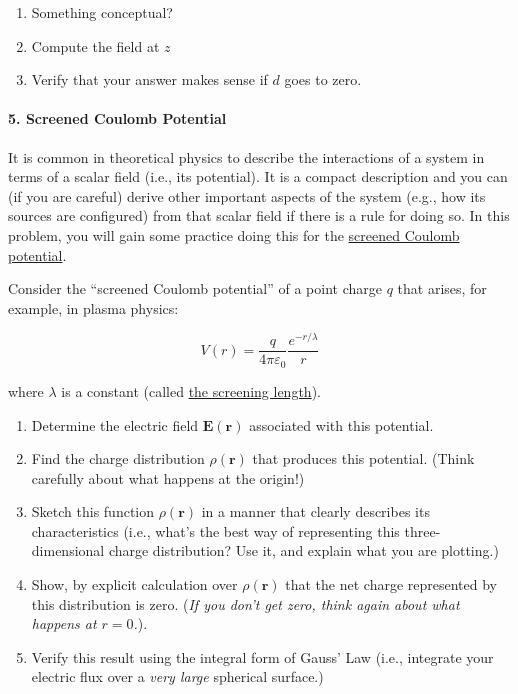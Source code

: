 \documentclass[11pt]{article}
\def\tightlist{}
\begin{document}
\begin{enumerate}
\def\labelenumi{\arabic{enumi}.}
\tightlist
\item
  Something conceptual?
\item
  Compute the field at \(z\)
\item
  Verify that your answer makes sense if \(d\) goes to zero.
\end{enumerate}

\paragraph{5. Screened Coulomb
Potential}\label{screened-coulomb-potential}

It is common in theoretical physics to describe the interactions of a
system in terms of a scalar field (i.e., its potential). It is a compact
description and you can (if you are careful) derive other important
aspects of the system (e.g., how its sources are configured) from that
scalar field if there is a rule for doing so. In this problem, you will
gain some practice doing this for the
\href{https://en.wikipedia.org/wiki/Electric-field_screening}{screened
Coulomb potential}.

Consider the ``screened Coulomb potential'' of a point charge \(q\) that
arises, for example, in plasma physics:

\[V(r) = \dfrac{q}{4\pi\varepsilon_0} \dfrac{e^{-r/\lambda}}{r}\]

where \(\lambda\) is a constant (called
\href{https://en.wikipedia.org/wiki/Debye_length}{the screening
length}).

\begin{enumerate}
\def\labelenumi{\arabic{enumi}.}
\tightlist
\item
  Determine the electric field \(\mathbf{E}(\mathbf{r})\) associated
  with this potential.
\item
  Find the charge distribution \(\rho(\mathbf{r})\) that produces this
  potential. (Think carefully about what happens at the origin!)
\item
  Sketch this function \(\rho(\mathbf{r})\) in a manner that clearly
  describes its characteristics (i.e., what's the best way of
  representing this three-dimensional charge distribution? Use it, and
  explain what you are plotting.)
\item
  Show, by explicit calculation over \(\rho(\mathbf{r})\) that the net
  charge represented by this distribution is zero. (\emph{If you don't
  get zero, think again about what happens at \(r = 0\).}).
\item
  Verify this result using the integral form of Gauss' Law (i.e.,
  integrate your electric flux over a \emph{very large} spherical
  surface.)
\end{enumerate}
\end{document}
